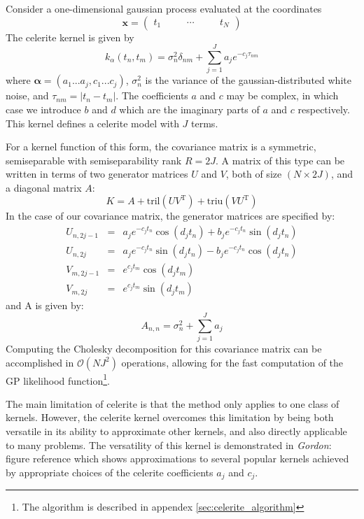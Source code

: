 \documentclass[preprint2]{aastex62}
\newcommand{\todo}[3]{{\color{#2}\emph{#1}: #3}}
\newcommand{\gordontodo}[1]{\todo{Gordon}{red}{#1}}
\newcommand{\project}[1]{\textsf{#1}}
\newcommand{\celerite}{\project{celerite }}
\newcommand{\bvec}[1]{{\ensuremath{\boldsymbol{#1}}}}
\newcommand{\T}{\ensuremath{\mathrm{T}}}
\newcommand{\expandvec}[2]{\left(\begin{array}{ccccc} #1\quad && \cdots\quad && #2 \end{array}\right)}
\begin{document}
		Consider a one-dimensional gaussian process evaluated at the coordinates
		\begin{equation}
			\bvec{x} = \expandvec{t_1}{t_N}
		\end{equation}
		The \celerite kernel is given by
		\begin{equation}
			k_\alpha(t_n, t_m) = \sigma_n^2 \delta_{nm} + \sum_{j=1}^J a_j e^{-c_j\tau_{nm}}
		\end{equation}
		where $\bvec{\alpha} = (a_1...a_j, c_1...c_j)$, $\sigma_n^2$ is the variance of the gaussian-distributed white noise, and $\tau_{nm} = |t_n-t_m|$. 
		The coefficients $a$ and $c$ may be complex, in which case we introduce $b$ and $d$ which are the imaginary parts of $a$ and $c$ respectively. 
		This kernel defines a \celerite model with $J$ terms. 
		
		For a kernel function of this form, the covariance matrix is a symmetric, semiseparable with semiseparability rank $R=2J$. A matrix of this type can 
		be written in terms of two generator matrices $U$ and $V$, both of size $(N\times 2J)$, and a diagonal matrix $A$:
		\begin{equation}
		\label{eqn:KUV}
			K = A + \mathrm{tril}(UV^\T) + \mathrm{triu}(VU^\T)
		\end{equation}	
		In the case of our covariance matrix, the generator matrices are specified by:	
		\begin{eqnarray}
			U_{n, 2j-1} &=& a_je^{-c_jt_n}\cos(d_jt_n) + b_je^{-c_jt_n}\sin(d_jt_n) \nonumber \\
			U_{n, 2j} &=& a_je^{-c_jt_n}\sin(d_jt_n) - b_je^{-c_jt_n}\cos(d_jt_n) \nonumber \\
			V_{m, 2j-1} &=& e^{c_jt_m}\cos(d_jt_m) \nonumber \\
			V_{m, 2j} &=& e^{c_jt_m}\sin(d_jt_m)
		\end{eqnarray}
		and A is given by:
		\begin{equation}
			A_{n,n} = \sigma_n^2 + \sum_{j=1}^Ja_j
		\end{equation}
		Computing the Cholesky decomposition for this covariance matrix can be accomplished in $\mathcal{O}(NJ^2)$ operations, allowing for the 
		fast computation of the GP likelihood function\footnote{The algorithm is described in appendex \ref{sec:celerite_algorithm}}. 
		
		The main limitation of \celerite is that the method only applies to one class of kernels. However, the \celerite kernel overcomes this limitation 
		by being both versatile in its ability to approximate other kernels, and also directly applicable to many problems. The versatility of this 
		kernel is demonstrated in \gordontodo{figure reference} which shows approximations to several popular kernels achieved by appropriate choices 
		of the \celerite coefficients $a_j$ and $c_j$. 
		
\end{document}
